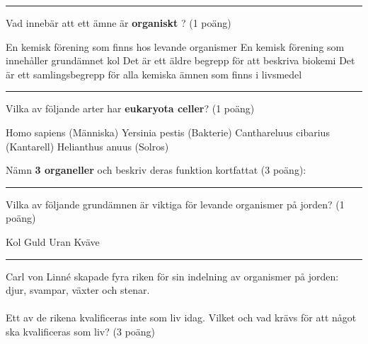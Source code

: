 \documentclass{exam}
\begin{document}
\begin{questions}
\vspace{5mm} 
\hrule 
\vspace{5mm} 

\question Vad innebär att ett ämne är \textbf{organiskt} ? (1 poäng)
\begin{checkboxes}
   \choice En kemisk förening som finns hos levande organismer
   \choice En kemisk förening som innehåller grundämnet kol
   \choice Det är ett äldre begrepp för att beskriva biokemi
   \choice Det är ett samlingsbegrepp för alla kemiska ämnen som finns i livsmedel
\end{checkboxes}
\vspace{5mm} 
\hrule 
\vspace{5mm} 

\question Vilka av följande arter har \textbf{eukaryota celler}? (1 poäng)
\begin{checkboxes}
   \choice Homo sapiens (Människa)
   \choice Yersinia pestis (Bakterie)
   \choice Canthareluus cibarius (Kantarell)
   \choice Helianthus anuus (Solros)
\end{checkboxes}

\break


\vspace{5mm} 
\vspace{5mm}
\question Nämn \textbf{3 organeller} och beskriv deras funktion kortfattat (3 poäng):
\vspace{40mm} 
\hrule 
\vspace{5mm}
\question 
Vilka av följande grundämnen är viktiga för levande organismer på jorden? (1 poäng)
\begin{checkboxes}
   \choice Kol
   \choice Guld
   \choice Uran
   \choice Kväve
\end{checkboxes}
\vspace{5mm}
\hrule 
\vspace{5mm}
\question
Carl von Linné skapade fyra riken för sin indelning av organismer på jorden: djur, svampar, växter och stenar.
\\ \\
Ett av de rikena kvalificeras inte som liv idag. Vilket och vad krävs för att något ska kvalificeras som liv? (3 poäng)

\break


\end{questions}
\end{document}

